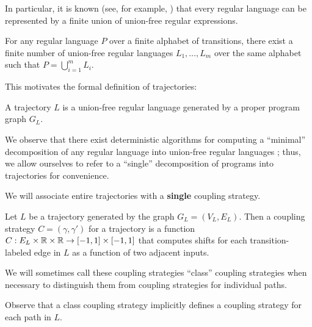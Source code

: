In particular, it is known (see, for example, \cite{afoninMinimalUnionFreeDecompositions2009}) that every regular language can be represented by a finite union of union-free regular expressions. 

\begin{cor}
    For any regular language $P$ over a finite alphabet of transitions, there exist a finite number of union-free regular languages $L_1,\ldots, L_m$ over the same alphabet such that $P = \bigcup_{i=1}^m L_i$.
\end{cor}

This motivates the formal definition of trajectories:

\begin{defn}
    A trajectory $L$ is a union-free regular language generated by a proper program graph $G_L$.
\end{defn}

We observe that there exist deterministic algorithms for computing a ``minimal'' decomposition of any regular language into union-free regular languages \cite{afoninMinimalUnionFreeDecompositions2009}; thus, we allow ourselves to refer to a ``single'' decomposition of programs into trajectories for convenience. 



We will associate entire trajectories with a \textbf{single} coupling strategy.

\begin{defn}
    Let $L$ be a trajectory generated by the graph $G_L = (V_L, E_L)$. Then a coupling strategy $C = (\gamma, \gamma')$ for a trajectory is a function $C:E_L\times\mathbb{R} \times\mathbb{R}\to [-1, 1]\times[-1, 1]$ that computes shifts for each transition-labeled edge in $L$ as a function of two adjacent inputs.
\end{defn}

We will sometimes call these coupling strategies ``class'' coupling strategies when necessary to distinguish them from coupling strategies for individual paths.

Observe that a class coupling strategy implicitly defines a coupling strategy for each path in $L$.

